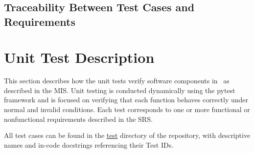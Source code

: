 \documentclass[12pt, titlepage]{article}
\begin{document}
\newpage
\subsection{Traceability Between Test Cases and Requirements}

\begin{table}[h!]
  \centering
  \caption{Traceability Matrix Showing the Connections Between Requirements and System Tests}
\end{table}


\section{Unit Test Description}\label{unit-test}

This section describes how the unit tests verify software components in \progname~as described in the MIS. Unit testing is conducted dynamically using the pytest framework and is focused on verifying that each function behaves correctly under normal and invalid conditions. Each test corresponds to one or more functional or nonfunctional requirements described in the SRS.

All test cases can be found in the \href{https://github.com/AliyahJimoh/2D-Localizer/tree/main/test}{test} directory of the repository, with descriptive names and in-code docstrings referencing their Test IDs.
\end{document}
